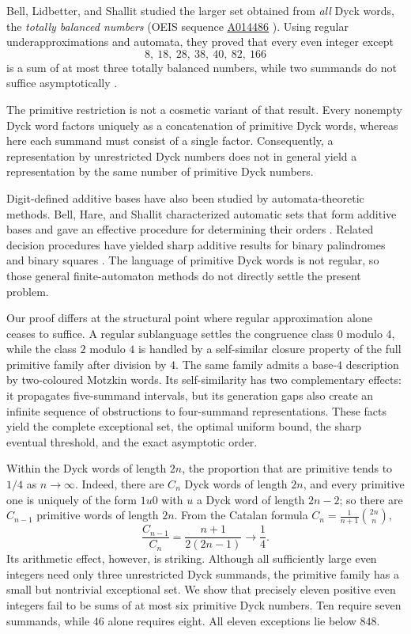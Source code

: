 \documentclass[12pt]{article}
\theoremstyle{plain}
\theoremstyle{definition}
\theoremstyle{plain}
\newcommand{\seqnum}[1]{\href{https://oeis.org/#1}{\rm \underline{#1}}}
\begin{document}
Bell, Lidbetter, and Shallit studied the larger set obtained from
\emph{all} Dyck words, the \emph{totally balanced numbers} (OEIS sequence
\seqnum{A014486} \cite{OEIS-A014486}).  Using regular underapproximations and automata,
they proved that every even integer except
\[
        8,\ 18,\ 28,\ 38,\ 40,\ 82,\ 166
\]
is a sum of at most three totally balanced numbers, while two summands
do not suffice asymptotically \cite[Thm.\ 14]{BLS}.

The primitive restriction is not a cosmetic variant of that result.
Every nonempty Dyck word factors uniquely as a concatenation of
primitive Dyck words, whereas here each summand must consist of a single
factor.  Consequently, a representation by unrestricted Dyck numbers
does not in general yield a representation by the same number of
primitive Dyck numbers.

Digit-defined additive bases have also been studied by automata-theoretic
methods.  Bell, Hare, and Shallit characterized automatic sets that form
additive bases and gave an effective procedure for determining their
orders \cite{BHS}.  Related decision procedures have yielded sharp
additive results for binary palindromes \cite{RSS} and binary squares
\cite{MNRS}.  The language of primitive Dyck words is not regular, so
those general finite-automaton methods do not directly settle the
present problem.

Our proof differs at the structural point where regular approximation
alone ceases to suffice.  A regular sublanguage settles the congruence
class $0$ modulo $4$, while the class $2$ modulo $4$ is handled by a
self-similar closure property of the full primitive family after division
by $4$.  The same family admits a base-$4$ description by two-coloured
Motzkin words.  Its self-similarity has two complementary effects: it
propagates five-summand intervals, but its generation gaps also create an
infinite sequence of obstructions to four-summand representations.  These
facts yield the complete exceptional set, the optimal uniform bound, the
sharp eventual threshold, and the exact asymptotic order.

Within the Dyck words of length $2n$, the proportion that are primitive
tends to $1/4$ as $n\to\infty$.  Indeed, there are $C_n$ Dyck words of
length $2n$, and every primitive one is uniquely of the form $1u0$ with
$u$ a Dyck word of length $2n-2$; so there are $C_{n-1}$ primitive words
of length $2n$.  From the Catalan formula
$C_n=\frac1{n+1}\binom{2n}{n}$,
\[
 \frac{C_{n-1}}{C_n}=\frac{n+1}{2(2n-1)}\longrightarrow\frac14 .
\]
Its arithmetic effect, however, is striking.  Although all sufficiently
large even integers need only three unrestricted Dyck summands, the
primitive family has a small but nontrivial exceptional set.  We show
that precisely eleven positive even integers fail to be sums of at most
six primitive Dyck numbers.  Ten require seven summands, while $46$
alone requires eight.  All eleven exceptions lie below $848$.
\end{document}
